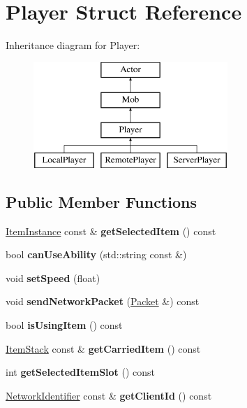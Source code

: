 \hypertarget{struct_player}{}\section{Player Struct Reference}
\label{struct_player}
Inheritance diagram for Player\+:\begin{figure}[H]
\begin{center}
\leavevmode
\includegraphics[height=4.000000cm]{struct_player}
\end{center}
\end{figure}
\subsection*{Public Member Functions}
\begin{DoxyCompactItemize}
\item 
\mbox{\label{struct_player_a3f9fbb4126870b62cd70f0d798dcdfc3}} 
\mbox{\hyperlink{struct_item_instance}{Item\+Instance}} const  \& {\bfseries get\+Selected\+Item} () const
\item 
\mbox{\label{struct_player_ab9bba0f78f00ddb4fdbd1ff40fbce892}} 
bool {\bfseries can\+Use\+Ability} (std\+::string const \&)
\item 
\mbox{\label{struct_player_ac7f7316998e08d7af94108c873111b61}} 
void {\bfseries set\+Speed} (float)
\item 
\mbox{\label{struct_player_aeca4c5987d900ad709275d7075e3eed9}} 
void {\bfseries send\+Network\+Packet} (\mbox{\hyperlink{struct_packet}{Packet}} \&) const
\item 
\mbox{\label{struct_player_abc08b04e996573c81dabf2479640a7b6}} 
bool {\bfseries is\+Using\+Item} () const
\item 
\mbox{\label{struct_player_aeb0f7414abbfd4f0db80bb5dd77cc952}} 
\mbox{\hyperlink{struct_item_stack}{Item\+Stack}} const  \& {\bfseries get\+Carried\+Item} () const
\item 
\mbox{\label{struct_player_aa85495bfeaa881d150f1e95d231ffe7e}} 
int {\bfseries get\+Selected\+Item\+Slot} () const
\item 
\mbox{\label{struct_player_a13c75f00fabd2a70d3410922da9a4d30}} 
\mbox{\hyperlink{struct_network_identifier}{Network\+Identifier}} const  \& {\bfseries get\+Client\+Id} () const
\end{DoxyCompactItemize}
